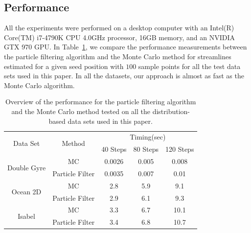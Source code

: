 \subsection{Performance}

All the experiments were performed on a desktop computer with an Intel(R) Core(TM) i7-4790K CPU 4.0GHz processor, 16GB memory, and an NVIDIA GTX 970 GPU. In Table~\ref{timing}, we compare the performance measurements between the particle filtering algorithm and the Monte Carlo method for streamlines estimated for a given seed position with $100$ sample points for all the test data sets used in this paper. In all the datasets, our approach is almost as fast as the Monte Carlo algorithm.

\begin{table}[!htb]
\centering
\begin{tabular}{|c|c|c|c|c|}
\hline
\multirow{2}{*}{Data Set}    & \multirow{2}{*}{Method}     & \multicolumn{3}{c|}{Timing(sec)}  \\ \cline{3-5}
                             &                             & 40 Steps  & 80 Steps & 120 Steps  \\ \hline
\multirow{2}{*}{Double Gyre} & MC                          & 0.0026    & 0.005    & 0.008      \\ \cline{2-5}
                             & Particle Filter             & 0.0035    & 0.007    & 0.01       \\ \hline
\multirow{2}{*}{Ocean 2D}    & MC                          & 2.8       & 5.9      & 9.1        \\ \cline{2-5}
                             & Particle Filter             & 2.9       & 6.1      & 9.3        \\ \hline
\multirow{2}{*}{Isabel}      & MC                          & 3.3       & 6.7      & 10.1       \\ \cline{2-5}
                             & Particle Filter             & 3.4       & 6.8      & 10.7       \\ \hline

\end{tabular}
\caption{Overview of the performance for the particle filtering algorithm and the Monte Carlo method tested on all the distribution-based data sets used in this paper.}
\label{timing}
\end{table}
